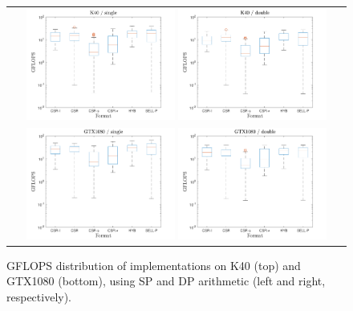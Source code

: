 \begin{figure}[p]
\begin{tabular}{c}
\includegraphics[width=0.45\textwidth]{plots/range_K40_single.pdf}
\includegraphics[width=0.45\textwidth]{plots/range_K40_double.pdf}\\
\includegraphics[width=0.45\textwidth]{plots/range_GTX1080_single.pdf}
\includegraphics[width=0.45\textwidth]{plots/range_GTX1080_double.pdf}
\end{tabular}
\caption[GFLOPS distribution of \spmv implementations]
    {GFLOPS distribution of \spmv implementations on K40 (top)
    and GTX1080 (bottom), using SP and DP arithmetic (left and right, respectively).}
\label{2017-csr-spmv:fig:distribution}
\end{figure}

